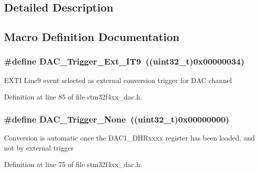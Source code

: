 \subsection{Detailed Description}


\subsection{Macro Definition Documentation}
\hypertarget{group___d_a_c__trigger__selection_ga67c15b2c26246a2304f9db28e25adcc4}{
\subsubsection[{D\-A\-C\-\_\-\-Trigger\-\_\-\-Ext\-\_\-\-I\-T9}]{\setlength{\rightskip}{0pt plus 5cm}\#define D\-A\-C\-\_\-\-Trigger\-\_\-\-Ext\-\_\-\-I\-T9~((uint32\-\_\-t)0x00000034)}}\label{group___d_a_c__trigger__selection_ga67c15b2c26246a2304f9db28e25adcc4}
E\-X\-T\-I Line9 event selected as external conversion trigger for D\-A\-C channel 

Definition at line 85 of file stm32f4xx\-\_\-dac.\-h.

\hypertarget{group___d_a_c__trigger__selection_ga7849138e043267668d755390d923e4ba}{
\subsubsection[{D\-A\-C\-\_\-\-Trigger\-\_\-\-None}]{\setlength{\rightskip}{0pt plus 5cm}\#define D\-A\-C\-\_\-\-Trigger\-\_\-\-None~((uint32\-\_\-t)0x00000000)}}\label{group___d_a_c__trigger__selection_ga7849138e043267668d755390d923e4ba}
Conversion is automatic once the D\-A\-C1\-\_\-\-D\-H\-Rxxxx register has been loaded, and not by external trigger 

Definition at line 75 of file stm32f4xx\-\_\-dac.\-h.


